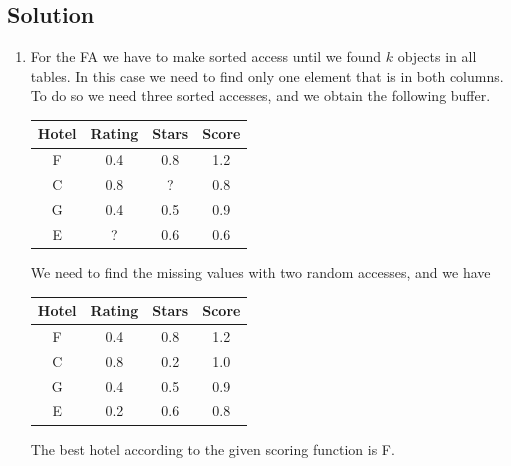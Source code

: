 \documentclass[12pt, a4paper]{report}
\newtheorem[style=M,bodystyle=\normalfont]{theorem}{Theorem}
\newtheorem[style=M,bodystyle=\normalfont]{corollary}{Corollary}
\newtheorem[style=M,bodystyle=\normalfont]{lemma}{Lemma}
\newtheorem[style=M,bodystyle=\normalfont]{definition}{Definition}
\begin{document}
    \subsection*{Solution}
        \begin{enumerate}
            \item For the FA we have to make sorted access until we found $k$ objects in all tables. 
                In this case we need to find only one element that is in both columns. To do so we need 
                three sorted accesses, and we obtain the following buffer. 
                \begin{table}[H]
                    \centering
                    \begin{tabular}{c|cc|c}
                    \hline
                    \textbf{Hotel} & \textbf{Rating} & \textbf{Stars} & \textbf{Score} \\ \hline
                    F     & 0.4    & 0.8   & 1.2   \\
                    C     & 0.8    & ?     & 0.8   \\
                    G     & 0.4    & 0.5   & 0.9   \\
                    E     & ?      & 0.6   & 0.6   \\ \hline
                    \end{tabular}
                \end{table}
                We need to find the missing values with two random accesses, and we have
                \begin{table}[H]
                    \centering
                    \begin{tabular}{c|cc|c}
                    \hline
                    \textbf{Hotel} & \textbf{Rating} & \textbf{Stars} & \textbf{Score} \\ \hline
                    F     & 0.4    & 0.8   & 1.2   \\
                    C     & 0.8    & 0.2   & 1.0   \\
                    G     & 0.4    & 0.5   & 0.9   \\
                    E     & 0.2    & 0.6   & 0.8   \\ \hline
                    \end{tabular}
                \end{table}
                The best hotel according to the given scoring function is F. 


\end{enumerate}
\end{document}
